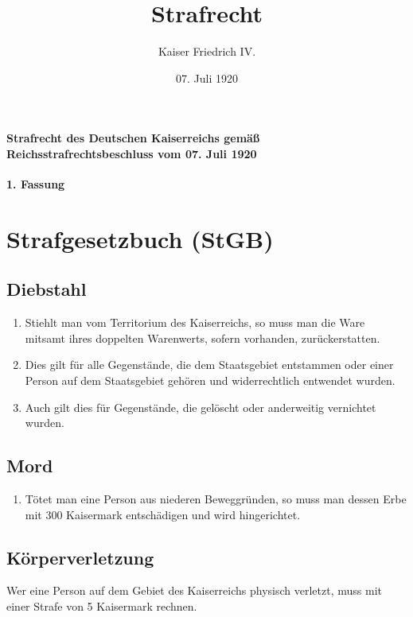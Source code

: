 \documentclass{article}
\title{Strafrecht}
\author{Kaiser Friedrich IV.}
\date{07. Juli 1920}
\begin{document}
\maketitle
\vspace*{\fill}
\paragraph{Strafrecht des Deutschen Kaiserreichs gemäß Reichsstrafrechtsbeschluss vom 07. Juli 1920}

\newpage
{}
\vspace*{\fill}
\begin{Center}
\textbf{1. Fassung}
\vspace*{\fill}
\end{Center}
\newpage
\tableofcontents
\newpage

\section{Strafgesetzbuch (StGB)}
\localtableofcontents
\subsection{Diebstahl}
\begin{enumerate}[(1)]
    \item Stiehlt man vom Territorium des Kaiserreichs, so muss man die Ware mitsamt ihres doppelten Warenwerts, sofern vorhanden, zurückerstatten.
    \item Dies gilt für alle Gegenstände, die dem Staatsgebiet entstammen oder einer Person auf dem Staatsgebiet gehören und widerrechtlich entwendet wurden.
    \item Auch gilt dies für Gegenstände, die gelöscht oder anderweitig vernichtet wurden.
\end{enumerate}

\subsection{Mord}
\begin{enumerate}[(1)]
    \item Tötet man eine Person aus niederen Beweggründen, so muss man dessen Erbe mit 300 Kaisermark entschädigen und wird hingerichtet.
\end{enumerate}

\subsection{Körperverletzung}
Wer eine Person auf dem Gebiet des Kaiserreichs physisch verletzt, muss mit einer Strafe von 5 Kaisermark rechnen.
\end{document}
